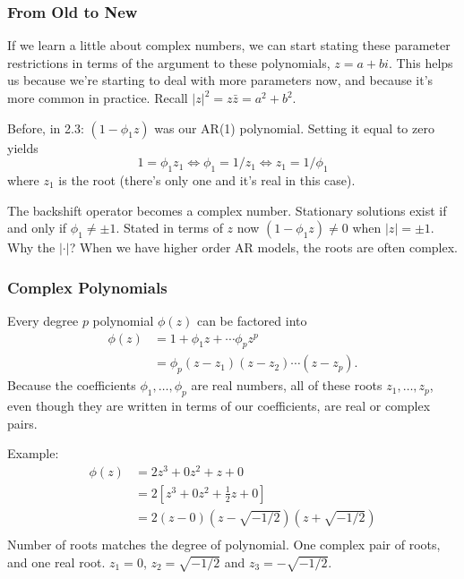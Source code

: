 \documentclass{beamer}
\begin{document}
\begin{frame}
\frametitle{From Old to New}

If we learn a little about complex numbers, we can start stating these parameter restrictions in terms of the argument to these polynomials, $z = a+bi$. This helps us because we're starting to deal with more parameters now, and because it's more common in practice. Recall $|z|^2 = z \bar{z} = a^2 + b^2$.
\newline

Before, in 2.3: $(1-\phi_1 z)$ was our AR(1) polynomial. Setting it equal to zero yields
\[
1 = \phi_1 z_1 \iff \phi_1 = 1/z_1 \iff z_1 = 1/\phi_1
\]
where $z_1$ is the root (there's only one and it's real in this case). 
\newline

The backshift operator becomes a complex number. Stationary solutions exist if and only if $\phi_1 \neq \pm 1$. Stated in terms of $z$ now $(1 - \phi_1 z) \neq 0$ when $|z| = \pm 1$. Why the $| \cdot |$? When we have higher order AR models, the roots are often complex.
\newline

\end{frame}


\begin{frame}
\frametitle{Complex Polynomials}

Every degree $p$ polynomial $\phi(z)$ can be factored into 
\begin{align*}
\phi(z) &= 1 + \phi_1 z + \cdots \phi_p z^p \\
&= \phi_p(z - z_1)(z - z_2)\cdots(z-z_p).
\end{align*}
Because the coefficients $\phi_1, \ldots, \phi_p$ are real numbers, all of these roots $z_1,\ldots, z_p$, even though they are written in terms of our coefficients, are real or complex pairs.
\newline

Example:
\begin{align*}
\phi(z) &= 2 z^3 + 0z^2 + z + 0 \\
&= 2[z^3 + 0z^2 + \frac{1}{2}z + 0]  \\
&= 2(z-0)(z-\sqrt{-1/2})(z+\sqrt{-1/2}) \\
\end{align*}
Number of roots matches the degree of polynomial. One complex pair of roots, and one real root. $z_1 = 0$, $z_2 = \sqrt{-1/2}$ and $z_3 = -\sqrt{-1/2}$.

\end{frame}
\end{document}
